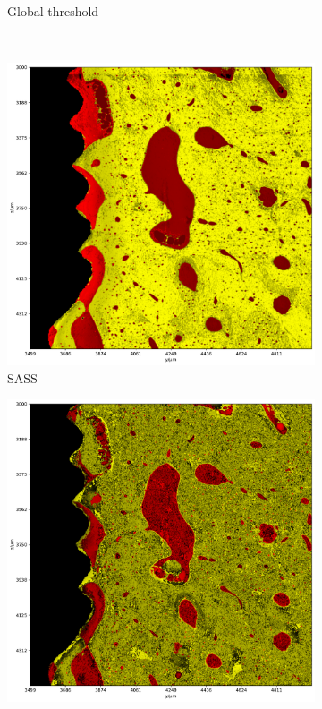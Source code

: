 \begin{figure}
\begin{subfigure}{0.5\textwidth}
      \caption{Global threshold}
    \end{subfigure}
    \\
    \begin{subfigure}{0.5\textwidth}
      \centering
      \includegraphics[width=\linewidth]{generated/770c_pag_segmented_zy_colored.pdf}
      \caption{SASS}
    \end{subfigure}%
    \begin{subfigure}{0.5\textwidth}
      \centering
      \includegraphics[width=\linewidth]{generated/770c_pag_global_zy_otsu.pdf}

\end{subfigure}
\end{figure}
